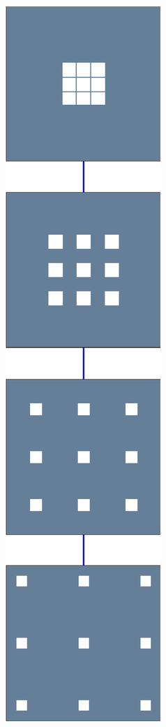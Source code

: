 \begin{figure}[!ht]\centering
\begin{subfigure}[b]{0.085\textwidth}\centering
	\includegraphics[width=\textwidth]{figures/exple-better-support/tree_classic.pdf}

\end{subfigure}
\end{figure}
